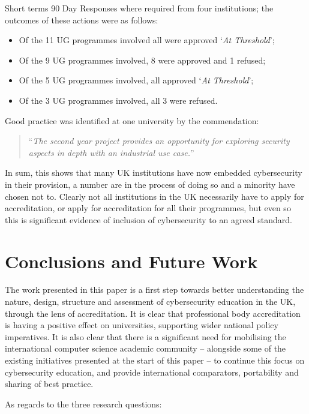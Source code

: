 \documentclass[conference]{IEEEtran}
\begin{document}
Short terms 90 Day Responses where required from four institutions; the outcomes of these actions were as follows:

\begin{itemize}                                                                
\item Of the 11 UG programmes involved all were approved `{\emph{At Threshold}}';
\item Of the 9 UG programmes involved, 8 were approved and 1 refused;
\item Of the 5 UG programmes involved, all approved `{\emph{At Threshold}}';
\item Of the 3 UG programmes involved, all 3 were refused.
\end{itemize}
 
Good practice was identified at one university by the commendation:
 \begin{quote}
``{\emph{The second year project provides an opportunity for exploring security aspects in depth with an industrial use case.}}''
\end{quote}

In sum, this shows that many UK institutions have now embedded cybersecurity in their provision, a number are in the process of doing so and a minority have chosen not to. Clearly not all institutions in the UK necessarily have to apply for accreditation, or apply for accreditation for all their programmes, but even so this is significant evidence of inclusion of cybersecurity to an agreed standard.

\section{Conclusions and Future Work}

The work presented in this paper is a first step towards better understanding the nature, design, structure and assessment of cybersecurity education in the UK, through the lens of accreditation. It is clear that professional body accreditation is having a positive effect on universities, supporting wider national policy imperatives. It is also clear that there is a significant need for mobilising the international computer science academic community -- alongside some of the existing initiatives presented at the start of this paper -- to continue this focus on cybersecurity education, and provide international comparators, portability and sharing of best practice. 

As regards to the three research questions:
\end{document}
